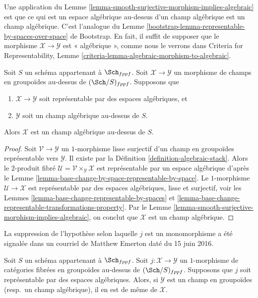 \noindent
Une application du
Lemme \ref{lemma-smooth-surjective-morphism-implies-algebraic}
est que ce qui est un espace algébrique au-dessus d'un champ algébrique
est un champ algébrique. C'est l'analogue du
Lemme \ref{bootstrap-lemma-representable-by-spaces-over-space} de Bootstrap.
En fait, il suffit de supposer que le morphisme
$\mathcal{X} \to \mathcal{Y}$ est « algébrique », comme nous le verrons dans
Criteria for Representability,
Lemme \ref{criteria-lemma-algebraic-morphism-to-algebraic}.

\begin{lemma}
\label{lemma-representable-morphism-to-algebraic}
Soit $S$ un schéma appartenant à $\Sch_{fppf}$.
Soit $\mathcal{X} \to \mathcal{Y}$ un morphisme de champs en groupoïdes
au-dessus de $(\Sch/S)_{fppf}$. Supposons que
\begin{enumerate}
\item $\mathcal{X} \to \mathcal{Y}$ soit représentable par des espaces algébriques, et
\item $\mathcal{Y}$ soit un champ algébrique au-dessus de $S$.
\end{enumerate}
Alors $\mathcal{X}$ est un champ algébrique au-dessus de $S$.
\end{lemma}

\begin{proof}
Soit $\mathcal{V} \to \mathcal{Y}$ un $1$-morphisme lisse surjectif
d'un champ en groupoïdes représentable vers $\mathcal{Y}$. Il existe par la
Définition \ref{definition-algebraic-stack}.
Alors le $2$-produit fibré
$\mathcal{U} = \mathcal{V} \times_{\mathcal Y} \mathcal X$
est représentable par un espace algébrique d'après le
Lemme \ref{lemma-base-change-by-space-representable-by-space}.
Le $1$-morphisme $\mathcal{U} \to \mathcal X$ est représentable par des espaces
algébriques, lisse et surjectif, voir les
Lemmes \ref{lemma-base-change-representable-by-spaces} et
\ref{lemma-base-change-representable-transformations-property}.
Par le
Lemme \ref{lemma-smooth-surjective-morphism-implies-algebraic},
on conclut que $\mathcal{X}$ est un champ algébrique.
\end{proof}

\begin{lemma}
\label{lemma-open-fibred-category-is-algebraic}
\begin{reference}
La suppression de l'hypothèse selon laquelle $j$ est un monomorphisme a été signalée
dans un courriel de Matthew Emerton daté du 15 juin 2016.
\end{reference}
Soit $S$ un schéma appartenant à $\Sch_{fppf}$.
Soit $j : \mathcal X \to \mathcal Y$ un $1$-morphisme de
catégories fibrées en groupoïdes au-dessus de $(\Sch/S)_{fppf}$.
Supposons que $j$ soit représentable par des espaces algébriques.
Alors, si $\mathcal{Y}$ est un champ en groupoïdes
(resp.\ un champ algébrique), il en est de même de $\mathcal{X}$.
\end{lemma}

